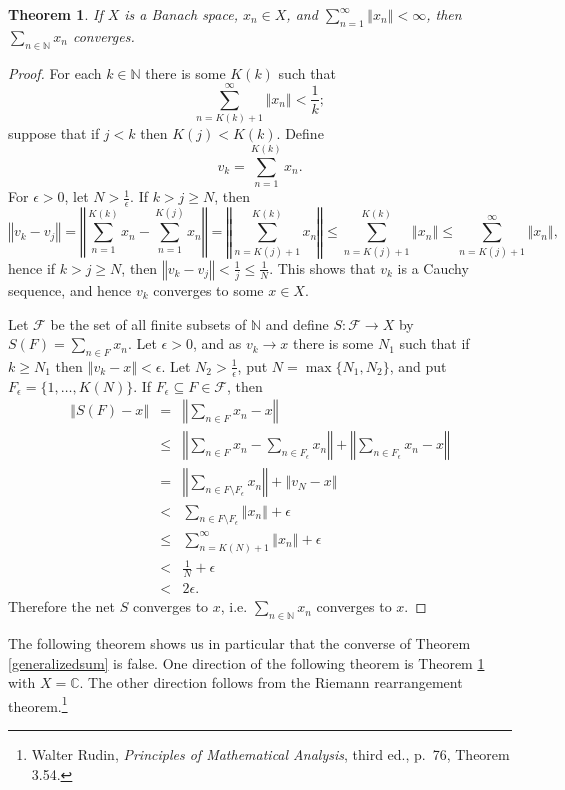 \documentclass{article}
\newcommand{\norm}[1]{\left\Vert #1 \right\Vert}
\newtheorem{theorem}{Theorem}
\begin{document}
\begin{theorem}
If $X$ is a Banach space, $x_n \in X$, and $\sum_{n=1}^\infty \norm{x_n}<\infty$, then $\sum_{n \in \mathbb{N}} x_n$ converges.
\label{absoluteconvergence}
\end{theorem}
\begin{proof}
For each $k \in \mathbb{N}$ there is some $K(k)$ such that 
\[
\sum_{n=K(k)+1}^\infty \norm{x_n} < \frac{1}{k};
\]
suppose that if $j<k$ then $K(j)<K(k)$.
Define
\[
v_k = \sum_{n=1}^{K(k)} x_n.
\]
For $\epsilon>0$, let $N>\frac{1}{\epsilon}$. If $k  > j \geq N$, then
\[
\norm{v_k-v_j}=\norm{\sum_{n=1}^{K(k)} x_n - \sum_{n=1}^{K(j)} x_n}
=\norm{\sum_{n=K(j)+1}^{K(k)} x_n}\leq
\sum_{n=K(j)+1}^{K(k)} \norm{x_n}
\leq \sum_{n=K(j)+1}^\infty \norm{x_n},
\]
hence if $k>j \geq N$, then $\norm{v_k-v_j} < \frac{1}{j} \leq \frac{1}{N}$. This shows that
 $v_k$ is a Cauchy sequence, and hence $v_k$ converges to some $x \in X$. 

Let $\mathscr{F}$ be the set of all finite subsets of $\mathbb{N}$ and define $S:\mathscr{F} \to X$ by 
$S(F) = \sum_{n \in F} x_n$.
Let $\epsilon>0$,  and
as $v_k \to x$ there is some $N_1$ such that if $k \geq N_1$ then
$\norm{v_k-x}<\epsilon$. Let $N_2> \frac{1}{\epsilon}$, put $N=\max\{N_1,N_2\}$, and put
$F_\epsilon=\{1,\ldots,K(N)\}$. If $F_\epsilon \subseteq F \in \mathscr{F}$, then
\begin{eqnarray*}
\norm{S(F)-x}&=&\norm{\sum_{n \in F} x_n - x}\\
&\leq&\norm{\sum_{n \in F} x_n -\sum_{n \in F_\epsilon} x_n} + \norm{\sum_{n \in F_\epsilon} x_n -x}\\
&=&\norm{\sum_{n \in F \setminus F_\epsilon} x_n} + \norm{v_N-x}\\
&<&\sum_{n \in F \setminus F_\epsilon} \norm{x_n}+\epsilon\\
&\leq&\sum_{n=K(N)+1}^\infty \norm{x_n}+\epsilon\\
&<&\frac{1}{N}+\epsilon\\
&<&2\epsilon.
\end{eqnarray*}
Therefore the net $S$ converges to $x$, i.e. $\sum_{n \in \mathbb{N}} x_n$ converges to $x$.
\end{proof}

The following theorem shows us in particular that
the converse of   Theorem \ref{generalizedsum} is false.
One direction of the following theorem is 
 Theorem \ref{absoluteconvergence} with $X=\mathbb{C}$. The other direction follows from the Riemann rearrangement theorem.\footnote{Walter Rudin, {\em Principles of Mathematical Analysis}, third ed., p.~76, Theorem 3.54.}
 
\end{document}
